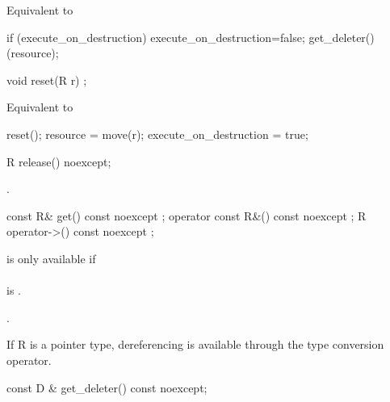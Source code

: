 \documentclass[ebook,11pt,article]{memoir}
\begin{document}
\pnum
\effects Equivalent to
\begin{codeblock}
  if (execute_on_destruction) {
    execute_on_destruction=false;
    get_deleter()(resource);
  }
\end{codeblock}

\begin{itemdecl}
void reset(R r) ;
\end{itemdecl}

\pnum
\effects Equivalent to
\begin{codeblock}
  reset();
  resource = move(r);
  execute_on_destruction = true;
\end{codeblock}


\begin{itemdecl}
R release() noexcept;
\end{itemdecl}

\pnum
\effects {}.

\pnum
\returns {}

\begin{itemdecl}
const R& get() const noexcept ;
operator const R&() const noexcept ;
R operator->() const noexcept ;
\end{itemdecl}

\pnum
\requires {} is only available if \\
\\ is . 

\pnum
\returns {}.

\pnum
\enternote If R is a pointer type, dereferencing is available through the type conversion operator.
\exitnote


\begin{itemdecl}
const D & get_deleter() const noexcept;
\end{itemdecl}

\pnum
\returns {}

\end{document}
